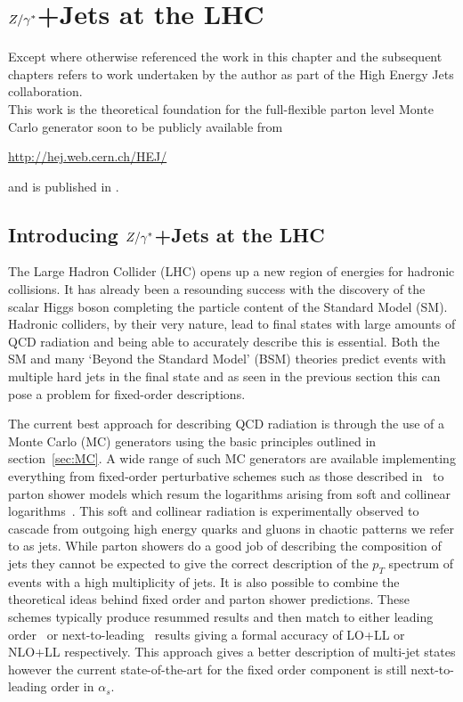 
\chapter{$Z/\gamma^*$+Jets at the LHC}
\label{chap:Zs}

	Except where otherwise referenced the work in this chapter and the subsequent chapters refers to
	work undertaken by the author as part of the High Energy Jets collaboration.\\This work is the theoretical foundation for the
	full-flexible parton level Monte Carlo generator soon to be publicly available from

	\begin{center}
		\url{http://hej.web.cern.ch/HEJ/}
	\end{center}

	and is published in \cite{ZPaper}.

\section{Introducing $Z/\gamma^*$+Jets at the LHC}

	The Large Hadron Collider (LHC) opens up a new region of energies for hadronic
	collisions.  It has already been a resounding success with the discovery of the
	scalar Higgs boson completing the particle content of the Standard Model (SM).
	Hadronic colliders, by their very nature, lead to final states with large
	amounts of QCD radiation and being able to accurately describe this is
	essential.  Both the SM and many `Beyond the Standard Model' (BSM) theories
	predict events with multiple hard jets in the final state and as seen in the
	previous section this can pose a problem for fixed-order descriptions.

	The current best approach for describing QCD radiation is through the use of
	a Monte Carlo (MC) generators using the basic principles outlined in section~\ref{sec:MC}.
	A wide range of such MC generators are available implementing everything from
	fixed-order perturbative schemes such as those described in~\cite{} to parton
	shower models which resum the logarithms arising from soft and collinear logarithms~\cite{}.
	This soft and collinear radiation is experimentally observed to cascade from outgoing
	high energy quarks and gluons in chaotic patterns we refer to as jets.  While parton
	showers do a good job of describing the composition of jets they cannot be expected to give the correct
	description of the $p_T$ spectrum of events with a high multiplicity of jets.
	It is also possible to combine the
	theoretical ideas behind fixed order and parton shower predictions.  These schemes typically
	produce resummed results and then match to either leading order~\cite{} or next-to-leading~\cite{}
	results giving a formal accuracy of LO+LL or NLO+LL respectively.  This approach gives a
	better description of multi-jet states however the current state-of-the-art for the
	fixed order component is still next-to-leading order in $\alpha_s$.

